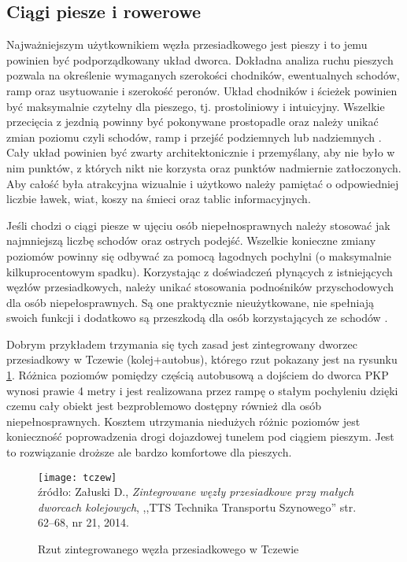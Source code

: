 \documentclass[twoside,12pt]{article}
\begin{document}
	\subsection{Ciągi piesze i rowerowe}
	
	Najważniejszym użytkownikiem węzła przesiadkowego jest pieszy i to jemu powinien być podporządkowany układ dworca. Dokładna analiza ruchu pieszych pozwala na określenie wymaganych szerokości chodników, ewentualnych schodów, ramp oraz usytuowanie i szerokość peronów. Układ chodników i ścieżek powinien być maksymalnie czytelny dla pieszego, tj. prostoliniowy i intuicyjny. Wszelkie przecięcia z jezdnią powinny być pokonywane prostopadle oraz należy unikać zmian poziomu czyli schodów, ramp i przejść podziemnych lub nadziemnych  \cite{zaluski}. Cały układ powinien być zwarty architektonicznie i przemyślany, aby nie było w nim punktów, z których nikt nie korzysta oraz punktów nadmiernie zatłoczonych. Aby całość była atrakcyjna wizualnie i użytkowo należy pamiętać o odpowiedniej liczbie ławek, wiat, koszy na śmieci oraz tablic informacyjnych. 
	
	Jeśli chodzi o ciągi piesze w ujęciu osób niepełnosprawnych należy stosować jak najmniejszą liczbę schodów oraz ostrych podejść. Wszelkie konieczne zmiany poziomów powinny się odbywać za pomocą łagodnych pochylni (o maksymalnie kilkuprocentowym spadku). Korzystając z doświadczeń płynących z istniejących węzłów przesiadkowych, należy unikać stosowania podnośników przyschodowych dla osób niepełosprawnych. Są one praktycznie nieużytkowane, nie spełniają swoich funkcji i dodatkowo są przeszkodą dla osób korzystających ze schodów \cite{zaluski}. 
	
	Dobrym przykładem trzymania się tych zasad jest zintegrowany dworzec przesiadkowy w Tczewie (kolej+autobus), którego rzut pokazany jest na rysunku \ref{tczew}. Różnica poziomów pomiędzy częścią autobusową a dojściem do dworca PKP wynosi prawie 4 metry i jest realizowana przez rampę o stałym pochyleniu dzięki czemu cały obiekt jest bezproblemowo dostępny również dla osób niepełnosprawnych. Kosztem utrzymania niedużych różnic poziomów jest konieczność poprowadzenia drogi dojazdowej tunelem pod ciągiem pieszym. Jest to rozwiązanie droższe ale bardzo komfortowe dla pieszych.
	
	\begin{figure}[H]
		\centering
		\caption{Rzut zintegrowanego węzła przesiadkowego w Tczewie}
		\texttt{[image: tczew]}\\
		\footnotesize{źródło: Załuski D., \emph{Zintegrowane węzły przesiadkowe przy małych dworcach kolejowych}, ,,TTS Technika Transportu Szynowego'' str. 62--68, nr 21, 2014. \cite{zaluski}}
		\label{tczew}
	\end{figure}
	
\end{document}
